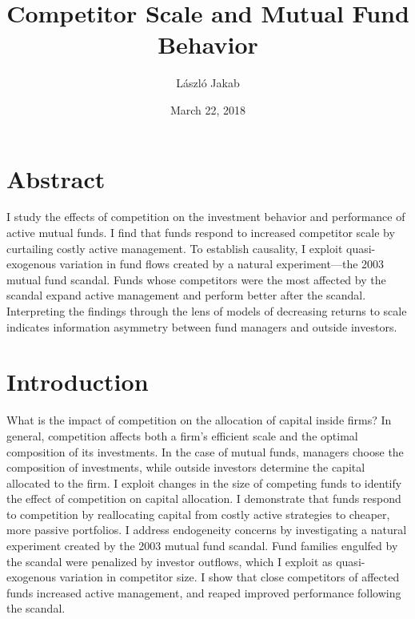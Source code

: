 \documentclass[openany]{book}
\title{Competitor Scale and Mutual Fund Behavior}
\author{László Jakab}
\date{March 22, 2018}
\theoremstyle{definition}
\theoremstyle{definition}
\theoremstyle{definition}
\theoremstyle{remark}
\begin{document}
\maketitle

{
\setcounter{tocdepth}{1}
\tableofcontents
}
\listoftables
\listoffigures
\doublespacing

\hypertarget{abstract}{%
\chapter*{Abstract}\label{abstract}}

I study the effects of competition on the investment behavior and
performance of active mutual funds. I find that funds respond to
increased competitor scale by curtailing costly active management. To
establish causality, I exploit quasi-exogenous variation in fund flows
created by a natural experiment---the 2003 mutual fund scandal. Funds
whose competitors were the most affected by the scandal expand active
management and perform better after the scandal. Interpreting the
findings through the lens of models of decreasing returns to scale
indicates information asymmetry between fund managers and outside
investors.

\hypertarget{introduction}{%
\chapter{Introduction}\label{introduction}}

What is the impact of competition on the allocation of capital inside
firms? In general, competition affects both a firm's efficient scale and
the optimal composition of its investments. In the case of mutual funds,
managers choose the composition of investments, while outside investors
determine the capital allocated to the firm. I exploit changes in the
size of competing funds to identify the effect of competition on capital
allocation. I demonstrate that funds respond to competition by
reallocating capital from costly active strategies to cheaper, more
passive portfolios. I address endogeneity concerns by investigating a
natural experiment created by the 2003 mutual fund scandal. Fund
families engulfed by the scandal were penalized by investor outflows,
which I exploit as quasi-exogenous variation in competitor size. I show
that close competitors of affected funds increased active management,
and reaped improved performance following the scandal.
\end{document}
